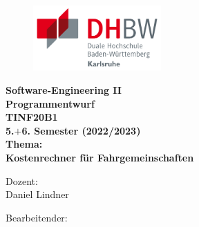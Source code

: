 \thispagestyle{empty}
\begin{titlepage}
\enlargethispage{4cm}

\begin{figure}           %
	\begin{minipage}{0.49\textwidth}
		\flushleft
	\end{minipage}
	\hfill
	\begin{minipage}{0.49\textwidth}
		\flushright
		\includegraphics[height=2.5cm]{Bilder/Logos/Logo_DHBW.pdf} 
	\end{minipage}
\end{figure} 
\vspace*{0.1cm}

\begin{center}
	\huge{\textbf{Software-Engineering II}}\\[1.5cm]
	\Large{\textbf{Programmentwurf}}\\
	\Large{\textbf{TINF20B1}}\\
	\Large{\textbf{5.$+$6. Semester (2022/2023)}}\\[1cm]
	\Large{\textbf{Thema:}}\\
	\Large{\textbf{Kostenrechner für Fahrgemeinschaften}}\\[2cm]
\end{center}

\begin{center}
	\normalsize{Dozent:}\\
	\large{Daniel Lindner}
\end{center}

\begin{center}
	\normalsize{Bearbeitender:}\\
	\Large{\bearbeitende}
\end{center}
\end{titlepage}

